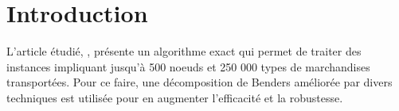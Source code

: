 
\pagebreak

\section*{Introduction}

%

L'article étudié, \cite [\textit{Benders Decomposition for Large-Scale Uncapacitated Hub Location}]{ccl}, présente un algorithme exact qui permet de traiter des instances impliquant jusqu'à 500 noeuds et 250 000 types de marchandises transportées. Pour ce faire, une décomposition de Benders améliorée par divers techniques est utilisée pour en augmenter l'efficacité et la robustesse. 

 
 




